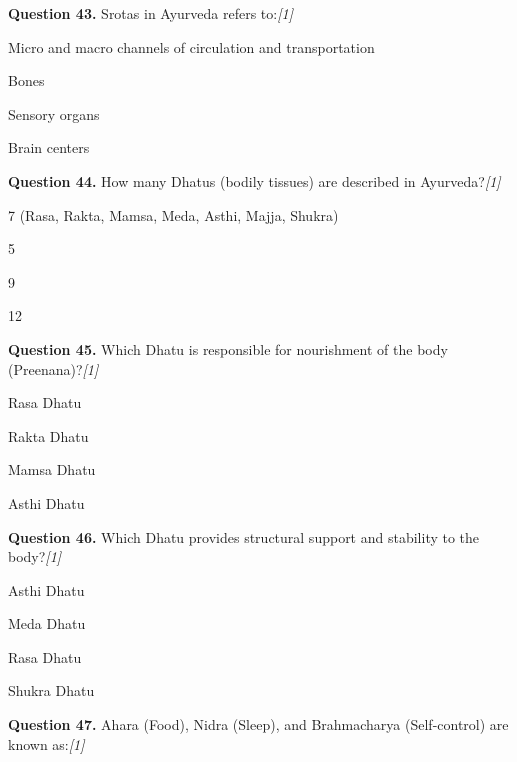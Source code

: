 \documentclass[11pt,a4paper]{article}
\newcommand{\pts}[1]{\hfill   \textit{[#1]}}
\begin{document}
\noindent   \textbf{Question 43.} Srotas in Ayurveda refers to:\pts{1}

\begin{parts}
  \item Micro and macro channels of circulation and transportation
  \item Bones
  \item Sensory organs
  \item Brain centers
\end{parts}

\medskip




\noindent   \textbf{Question 44.} How many Dhatus (bodily tissues) are described in Ayurveda?\pts{1}

\begin{parts}
  \item 7 (Rasa, Rakta, Mamsa, Meda, Asthi, Majja, Shukra)
  \item 5
  \item 9
  \item 12
\end{parts}

\medskip




\noindent   \textbf{Question 45.} Which Dhatu is responsible for nourishment of the body (Preenana)?\pts{1}

\begin{parts}
  \item Rasa Dhatu
  \item Rakta Dhatu
  \item Mamsa Dhatu
  \item Asthi Dhatu
\end{parts}

\medskip




\noindent   \textbf{Question 46.} Which Dhatu provides structural support and stability to the body?\pts{1}

\begin{parts}
  \item Asthi Dhatu
  \item Meda Dhatu
  \item Rasa Dhatu
  \item Shukra Dhatu
\end{parts}

\medskip




\noindent   \textbf{Question 47.} Ahara (Food), Nidra (Sleep), and Brahmacharya (Self-control) are known as:\pts{1}
\end{document}
